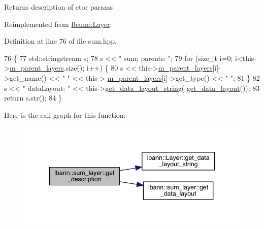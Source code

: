 Returns description of ctor params 

Reimplemented from \hyperlink{classlbann_1_1Layer_acc0803d3428914ca1eb5988c4309174a}{lbann\+::\+Layer}.



Definition at line 76 of file sum.\+hpp.


\begin{DoxyCode}
76                                              \{
77     std::stringstream s;
78      s << \textcolor{stringliteral}{" sum; parents: "};
79      \textcolor{keywordflow}{for} (\textcolor{keywordtype}{size\_t} i=0; i<this->\hyperlink{classlbann_1_1Layer_a3fa7c6cf1a22bb14ab0e85e3dc6027c5}{m\_parent\_layers}.size(); i++) \{
80        s << this->\hyperlink{classlbann_1_1Layer_a3fa7c6cf1a22bb14ab0e85e3dc6027c5}{m\_parent\_layers}[i]->get\_name() << \textcolor{stringliteral}{" "} << this->
      \hyperlink{classlbann_1_1Layer_a3fa7c6cf1a22bb14ab0e85e3dc6027c5}{m\_parent\_layers}[i]->get\_type() << \textcolor{stringliteral}{" "};
81      \}
82      s << \textcolor{stringliteral}{" dataLayout: "} << this->\hyperlink{classlbann_1_1Layer_ae3f4a5602df821f4221614b1e3782dc1}{get\_data\_layout\_string}(
      \hyperlink{classlbann_1_1sum__layer_a6c71a7d29f6e36b2a1f588a2545c769e}{get\_data\_layout}());
83      \textcolor{keywordflow}{return} s.str();
84   \}
\end{DoxyCode}
Here is the call graph for this function\+:\nopagebreak
\begin{figure}[H]
\begin{center}
\leavevmode
\includegraphics[width=343pt]{classlbann_1_1sum__layer_a73e45687c97990d88a2e31dc177ef56e_cgraph}
\end{center}
\end{figure}
\mbox{\label{classlbann_1_1sum__layer_a852552a520dec8e906b0d76524d73cc4}} 
